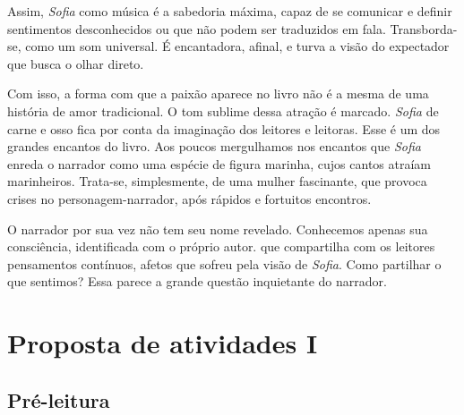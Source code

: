 \documentclass[12pt]{extarticle}
\begin{document}
Assim, \textit{Sofia} como música é a
sabedoria máxima, capaz de se comunicar e definir sentimentos
desconhecidos ou que não podem ser traduzidos em fala. Transborda-se, como 
um som universal. É encantadora, afinal, e turva a visão do expectador que 
busca o olhar direto.  

Com isso, a forma com que a paixão aparece no livro não é a mesma
de uma história de amor tradicional. O tom sublime dessa atração é 
marcado.  \textit{Sofia} de carne e osso fica por conta da imaginação
dos leitores e leitoras. Esse é um dos grandes encantos do livro. Aos poucos
mergulhamos nos encantos que \textit{Sofia} enreda o narrador como uma espécie 
de figura marinha, cujos cantos atraíam marinheiros.
Trata-se, simplesmente, de uma mulher fascinante, que provoca crises no
personagem-narrador, após rápidos e fortuitos encontros.  

O narrador por sua vez não tem seu nome revelado. Conhecemos apenas sua
consciência, identificada com o próprio autor. 
que compartilha com os leitores pensamentos contínuos, afetos que sofreu
pela visão de \textit{Sofia}. Como partilhar o que sentimos? 
Essa parece a grande questão inquietante do narrador.  





\section{Proposta de atividades I}

\subsection{Pré-leitura}




\end{document}
